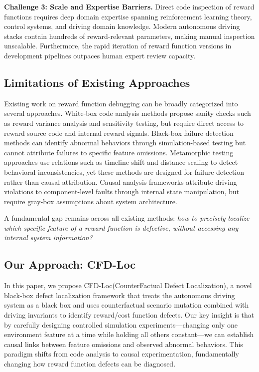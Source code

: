 \documentclass[conference]{IEEEtran}
\theoremstyle{plain}
\newcommand{\methodname}{CFD-Loc}
\begin{document}
\textbf{Challenge 3: Scale and Expertise Barriers.} Direct code inspection of reward functions requires deep domain expertise spanning reinforcement learning theory, control systems, and driving domain knowledge. Modern autonomous driving stacks contain hundreds of reward-relevant parameters, making manual inspection unscalable. Furthermore, the rapid iteration of reward function versions in development pipelines outpaces human expert review capacity.

\subsection{Limitations of Existing Approaches}

Existing work on reward function debugging can be broadly categorized into several approaches. White-box code analysis methods \cite{knox2023reward} propose sanity checks such as reward variance analysis and sensitivity testing, but require direct access to reward source code and internal reward signals. Black-box failure detection methods \cite{remav2024} can identify abnormal behaviors through simulation-based testing but cannot attribute failures to specific feature omissions. Metamorphic testing approaches \cite{deng2023rmt} use relations such as timeline shift and distance scaling to detect behavioral inconsistencies, yet these methods are designed for failure detection rather than causal attribution. Causal analysis frameworks \cite{wan2024dvca} attribute driving violations to component-level faults through internal state manipulation, but require gray-box assumptions about system architecture.

A fundamental gap remains across all existing methods: \emph{how to precisely localize which specific feature of a reward function is defective, without accessing any internal system information?}

\subsection{Our Approach: \methodname}

In this paper, we propose \methodname (CounterFactual Defect Localization), a novel black-box defect localization framework that treats the autonomous driving system as a black box and uses counterfactual scenario mutation combined with driving invariants to identify reward/cost function defects. Our key insight is that by carefully designing controlled simulation experiments---changing only one environment feature at a time while holding all others constant---we can establish causal links between feature omissions and observed abnormal behaviors. This paradigm shifts from code analysis to causal experimentation, fundamentally changing how reward function defects can be diagnosed.
\end{document}
